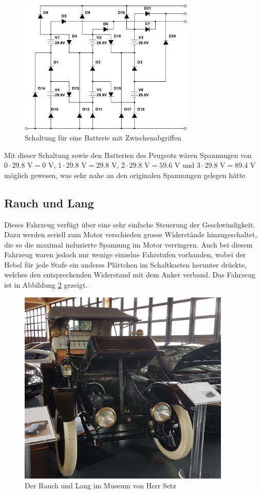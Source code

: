 \begin{figure}[h!]
	\centering
		\includegraphics[width=0.75\textwidth]{images/68.PNG}
	\caption{Schaltung für eine Batterie mit Zwischenabgriffen}
	\label{fig:68}
\end{figure}

Mit dieser Schaltung sowie den Batterien des Peugeots wären Spannungen von $0\cdot29.8$ V$=0$ V, $1\cdot29.8$ V$=29.8$ V, $2\cdot29.8$ V$=59.6$ V und $3\cdot29.8$ V$=89.4$ V möglich gewesen, was sehr nahe an den originalen Spannungen gelegen hätte.

\subsection{Rauch und Lang}
Dieses Fahrzeug verfügt über eine sehr einfache Steuerung der Geschwindigkeit. Dazu werden seriell zum Motor verschieden grosse Widerstände hinzugeschaltet, die so die maximal induzierte Spannung im Motor verringern. Auch bei diesem Fahrzeug waren jedoch nur wenige einzelne Fahrstufen vorhanden, wobei der Hebel für jede Stufe ein anderes Plättchen im Schaltkasten herunter drückte, welches den entsprechenden Widerstand mit dem Anker verband. Das Fahrzeug ist in Abbildung \ref{fig:Setz} gezeigt.

\begin{figure}[p]
	\centering
		\includegraphics[width=0.9\textwidth]{images/Setz.JPG}
	\caption{Der Rauch und Lang im Museum von Herr Setz}
	\label{fig:Setz}
\end{figure}

